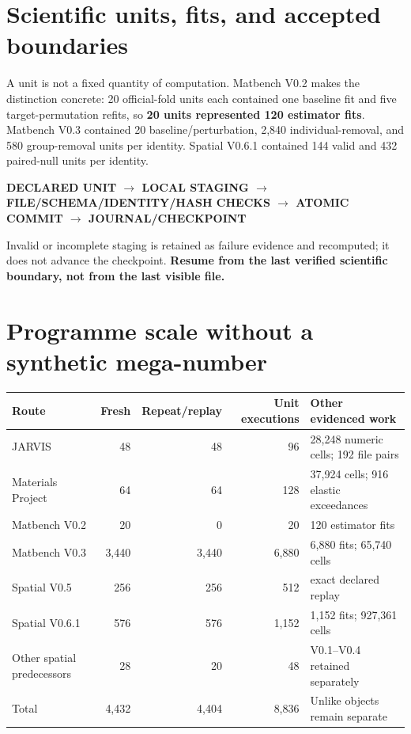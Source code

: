 \section{Scientific units, fits, and accepted boundaries}

A unit is not a fixed quantity of computation. Matbench V0.2 makes the distinction concrete: 20 official-fold units each contained one baseline fit and five target-permutation refits, so \textbf{20 units represented 120 estimator fits}. Matbench V0.3 contained 20 baseline/perturbation, 2,840 individual-removal, and 580 group-removal units per identity. Spatial V0.6.1 contained 144 valid and 432 paired-null units per identity.

\begin{center}\small\bfseries
DECLARED UNIT $\rightarrow$ LOCAL STAGING $\rightarrow$ FILE/SCHEMA/IDENTITY/HASH CHECKS $\rightarrow$ ATOMIC COMMIT $\rightarrow$ JOURNAL/CHECKPOINT
\end{center}
Invalid or incomplete staging is retained as failure evidence and recomputed; it does not advance the checkpoint. \textbf{Resume from the last verified scientific boundary, not from the last visible file.}

\section{Programme scale without a synthetic mega-number}
\begin{tabularx}{\textwidth}{p{}r r r Y}
\toprule Route & Fresh & Repeat/replay & Unit executions & Other evidenced work\\\midrule
JARVIS & 48 & 48 & 96 & 28,248 numeric cells; 192 file pairs\\
Materials Project & 64 & 64 & 128 & 37,924 cells; 916 elastic exceedances\\
Matbench V0.2 & 20 & 0 & 20 & 120 estimator fits\\
Matbench V0.3 & 3,440 & 3,440 & 6,880 & 6,880 fits; 65,740 cells\\
Spatial V0.5 & 256 & 256 & 512 & exact declared replay\\
Spatial V0.6.1 & 576 & 576 & 1,152 & 1,152 fits; 927,361 cells\\
Other spatial predecessors & 28 & 20 & 48 & V0.1--V0.4 retained separately\\\midrule
Total & 4,432 & 4,404 & 8,836 & Unlike objects remain separate\\\bottomrule
\end{tabularx}


